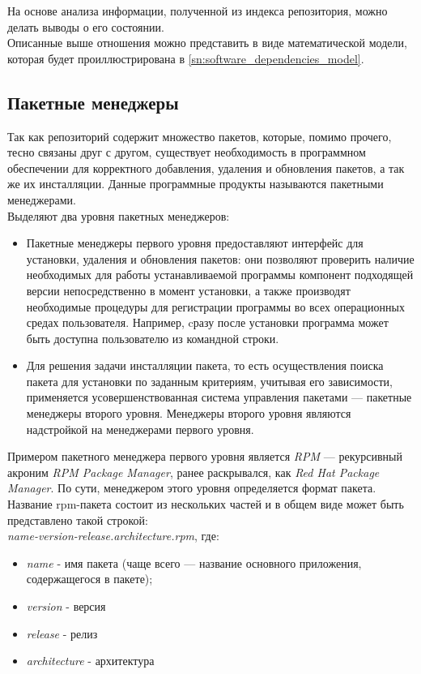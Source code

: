 На основе анализа информации, полученной из индекса репозитория,
можно делать выводы о его состоянии. \\

Описанные выше отношения можно представить в виде математической модели,
которая будет проиллюстрирована в \ref{sn:software_dependencies_model}.


\subsection{Пакетные менеджеры}
Так как репозиторий содержит множество пакетов, которые, помимо прочего, тесно
связаны друг с другом, существует необходимость в программном обеспечении для
корректного добавления, удаления и обновления пакетов, а так же их инсталляции.
Данные программные продукты называются пакетными менеджерами.\\

Выделяют два уровня пакетных менеджеров:
\begin{itemize}
\item{Пакетные менеджеры первого уровня предоставляют интерфейс для установки,
удаления и обновления пакетов: они позволяют проверить наличие необходимых для
работы устанавливаемой программы компонент подходящей версии непосредственно 
в момент установки, а также производят необходимые процедуры для регистрации 
программы во всех операционных средах пользователя. Например, cразу после установки 
программа может быть доступна пользователю из командной строки.}
\item{Для решения задачи инсталляции пакета, то есть осуществления поиска пакета для
установки по заданным критериям, учитывая его зависимости, применяется усовершенствованная
система управления пакетами --- пакетные менеджеры второго уровня. Менеджеры второго уровня 
являются надстройкой на менеджерами первого уровня.}
\end{itemize}

Примером пакетного менеджера первого уровня является  \textit{RPM} --- рекурсивный акроним 
\textit{RPM Package Manager}, ранее раскрывался, как \textit{Red Hat Package Manager}.
По сути, менеджером этого уровня определяется формат пакета.\\

Название rpm-пакета состоит из нескольких частей и в общем виде может быть представлено
такой строкой: \\
\textit{name-version-release.architecture.rpm}, где:
\begin{itemize}
\item{\textit{name} - имя пакета (чаще всего --- название основного приложения, содержащегося в пакете);}
\item{\textit{version} - версия}
\item{\textit{release} - релиз}
\item{\textit{architecture} - архитектура}
\end{itemize}

